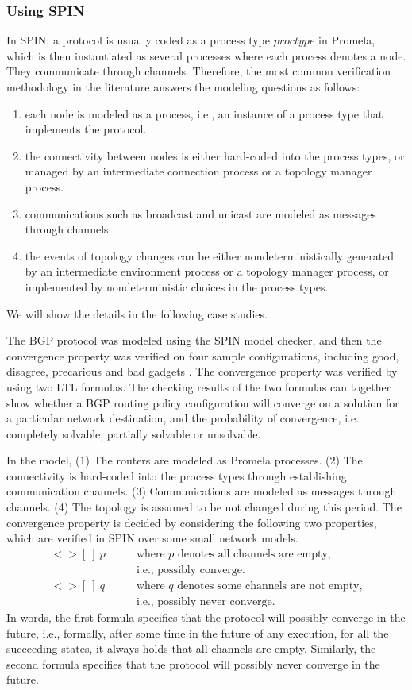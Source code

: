 \documentclass[a4paper,10pt,twocolumn]{article}
\begin{document}
\subsubsection{Using SPIN}
In SPIN, a protocol is usually coded as a process type $proctype$ in Promela, which is then instantiated as several processes where each process denotes a node. They communicate through channels. Therefore, the most common verification methodology in the literature answers the modeling questions as follows:
\begin{enumerate}
  \item each node is modeled as a process, i.e., an instance of a process type that implements the protocol.
  \item the connectivity between nodes is either hard-coded into the process types, or managed by an intermediate connection process or a topology manager process.
  \item communications such as broadcast and unicast are modeled as messages through channels.
  \item the events of topology changes can be either nondeterministically generated by an intermediate environment process or a topology manager process, or implemented by nondeterministic choices in the process types.
\end{enumerate}
We will show the details in the following case studies.

The BGP protocol was modeled using the SPIN model checker, and then the convergence property was verified on four sample configurations, including good, disagree, precarious and bad gadgets \cite{Huadmai11}. The convergence property was verified by using two LTL formulas. The checking results of the two formulas can together show whether a BGP routing policy configuration will converge on a solution for a particular network destination, and the probability of convergence, i.e. completely solvable, partially solvable or unsolvable.

In the model, (1) The routers are modeled as Promela processes. (2) The connectivity is hard-coded into the process types through establishing communication channels. (3) Communications are modeled as messages through channels. (4) The topology is assumed to be not changed during this period. The convergence property is decided by considering the following two properties, which are verified in SPIN over some small network models.
\begin{align*}
    <> [~]~p &\text{~~~~~~where $p$ denotes all channels are empty,}\\
             &\text{~~~~~~i.e., possibly converge.}\\
    <> [~]~q &\text{~~~~~~where $q$ denotes some channels are not empty,}\\
             &\text{~~~~~~i.e., possibly never converge.}
\end{align*}
In words, the first formula specifies that the protocol will possibly converge in the future, i.e., formally, after some time in the future of any execution, for all the succeeding states, it always holds that all channels are empty. Similarly, the second formula specifies that the protocol will possibly never converge in the future.
\end{document}
